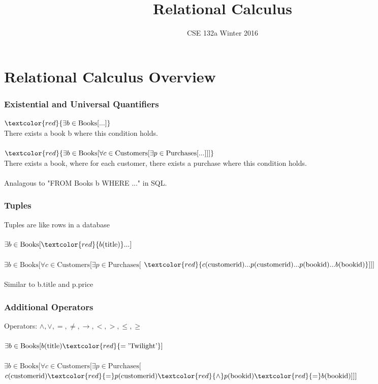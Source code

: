 \documentclass{beamer}
\begin{document}

\title{Relational Calculus}

\date[WI 2016]{CSE 132a Winter 2016}

\subject{Relational Calculus} %

\begin{frame}
  \titlepage
\end{frame}

\section{Relational Calculus Overview}

\begin{frame}
  \frametitle{Existential and Universal Quantifiers}
  $\textcolor{red}{\exists b \in \text{Books} [...]}$\\
  There exists a book b where this condition holds.\\
  \hfill \\
  $\textcolor{red}{\exists b \in \text{Books} [\forall c \in \text{Customers} [ \exists p \in \text{Purchases} [...] ] ]}$\\
  There exists a book, where for each customer, there exists a purchase where this condition holds.\\
  \hfill \\
  Analagous to "FROM Books b WHERE ..." in SQL.
\end{frame}

\begin{frame}
  \frametitle{Tuples}
  Tuples are like rows in a database\\
  \hfill \\
  $\exists b \in \text{Books} [\textcolor{red}{b(\text{title})} ...]$\\
  \hfill \\
  $\exists b \in \text{Books} [\forall c \in \text{Customers} [ \exists p \in \text{Purchases} [ $
  $\textcolor{red}{c(\text{customerid}) ... p(\text{customerid}) ... p(\text{bookid}) ... b(\text{bookid})}] ] ]$\\
  \hfill \\
  Similar to b.title and p.price
\end{frame}

\begin{frame}
  \frametitle{Additional Operators}
  Operators: $\land, \lor, =, \neq, \rightarrow, <, >, \leq, \geq$\\
  \hfill \\
  $\exists b \in \text{Books} [b(\text{title}) \textcolor{red}{= \text{'Twilight'}}]$\\
  \hfill \\
  $\exists b \in \text{Books} [\forall c \in \text{Customers} [ \exists p \in \text{Purchases} [$
  $c(\text{customerid}) \textcolor{red}{=} p(\text{customerid}) \textcolor{red}{\land}  p(\text{bookid}) \textcolor{red}{=} b(\text{bookid})] ] ]$\\
  \hfill \\
\end{frame}
\end{document}
